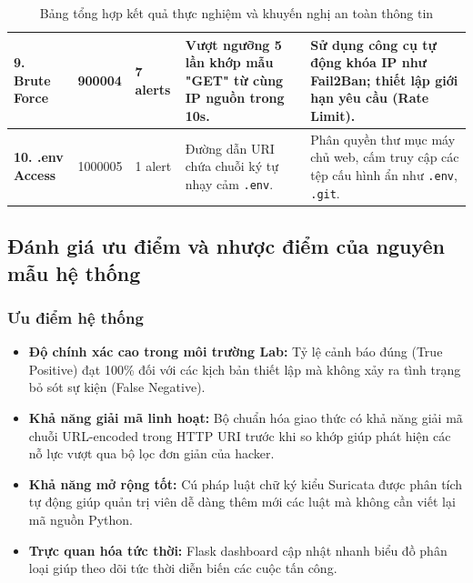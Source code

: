\begin{table}[H]
\begin{tabular}{|C{1.8cm}|C{1.8cm}|C{1.3cm}|C{4.5cm}|C{4.5cm}|}
        \textbf{9. Brute Force} & 900004 & 7 alerts & Vượt ngưỡng 5 lần khớp mẫu "GET" từ cùng IP nguồn trong 10s. & Sử dụng công cụ tự động khóa IP như Fail2Ban; thiết lập giới hạn yêu cầu (Rate Limit). \\ \hline
        \textbf{10. .env Access} & 1000005 & 1 alert & Đường dẫn URI chứa chuỗi ký tự nhạy cảm \texttt{.env}. & Phân quyền thư mục máy chủ web, cấm truy cập các tệp cấu hình ẩn như \texttt{.env}, \texttt{.git}. \\ \hline
    \end{tabular}
    \caption{Bảng tổng hợp kết quả thực nghiệm và khuyến nghị an toàn thông tin}
    \label{tab:experiment_results}
\end{table}

\subsection{Đánh giá ưu điểm và nhược điểm của nguyên mẫu hệ thống}

\subsubsection{Ưu điểm hệ thống}
\begin{itemize}
    \item \textbf{Độ chính xác cao trong môi trường Lab:} Tỷ lệ cảnh báo đúng (True Positive) đạt 100\% đối với các kịch bản thiết lập mà không xảy ra tình trạng bỏ sót sự kiện (False Negative).
    \item \textbf{Khả năng giải mã linh hoạt:} Bộ chuẩn hóa giao thức có khả năng giải mã chuỗi URL-encoded trong HTTP URI trước khi so khớp giúp phát hiện các nỗ lực vượt qua bộ lọc đơn giản của hacker.
    \item \textbf{Khả năng mở rộng tốt:} Cú pháp luật chữ ký kiểu Suricata được phân tích tự động giúp quản trị viên dễ dàng thêm mới các luật mà không cần viết lại mã nguồn Python.
    \item \textbf{Trực quan hóa tức thời:} Flask dashboard cập nhật nhanh biểu đồ phân loại giúp theo dõi tức thời diễn biến các cuộc tấn công.
\end{itemize}

